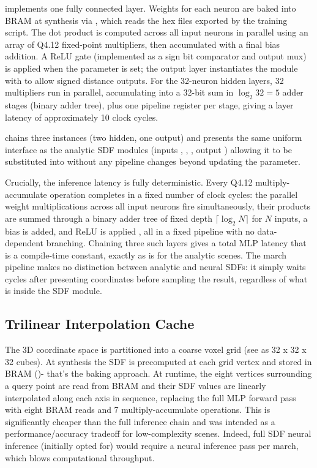  implements one fully connected layer. Weights for each
neuron are baked into BRAM at synthesis via , which reads the
hex files exported by the training script. The dot product is computed across
all input neurons in parallel using an array of Q4.12 fixed-point multipliers,
then accumulated with a final bias addition. A ReLU gate (implemented as a sign
bit comparator and output mux) is applied when the  parameter
is set; the output layer instantiates the module with  to
allow signed distance outputs. For the 32-neuron hidden layers, 32 multipliers
run in parallel, accumulating into a 32-bit sum in $\log_2 32 = 5$ adder stages
(binary adder tree), plus one pipeline register per stage, giving a layer latency
of approximately 10 clock cycles.

 chains three  instances (two hidden,
one output) and presents the same uniform interface as the analytic SDF modules
(inputs , , , output ) allowing
it to be substituted into  without any pipeline changes beyond
updating the  parameter.

Crucially, the inference latency is fully deterministic. Every Q4.12
multiply-accumulate operation completes in a fixed number of clock cycles:
the parallel weight multiplications across all input neurons fire simultaneously,
their products are summed through a binary adder tree of fixed depth
$\lceil\log_2 N\rceil$ for $N$ inputs, a bias is added, and ReLU is applied
, all in a fixed pipeline with no data-dependent branching.
Chaining three such layers gives a total MLP latency that is a compile-time
constant, exactly as  is for the analytic scenes.
The march pipeline makes no distinction between analytic and neural SDFs:
it simply waits  cycles after presenting coordinates before
sampling the result, regardless of what is inside the SDF module.


\subsection{Trilinear Interpolation Cache}

The 3D coordinate space is partitioned into a coarse voxel grid (see as 32 x 32 x 32 cubes). At synthesis
the SDF is precomputed at each grid vertex and stored in BRAM ()- that's the baking approach.
At runtime, the eight vertices surrounding a query point are read from BRAM and
their SDF values are linearly interpolated along each axis in sequence, replacing
the full MLP forward pass with eight BRAM reads and 7 multiply-accumulate
operations. This is significantly cheaper than the full inference chain and was
intended as a performance/accuracy tradeoff for low-complexity scenes. Indeed, full SDF neural inference (initially opted for) would require a neural inference pass per march, which blows computational throughput.

